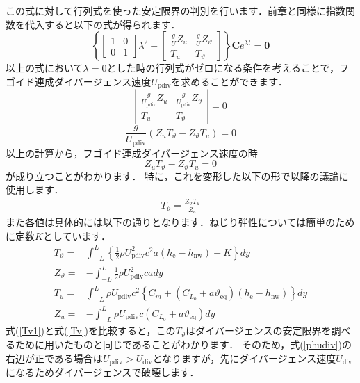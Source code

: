 \documentclass{jarticle}
\begin{document}
この式に対して行列式を使った安定限界の判別を行います．前章と同様に指数関数を代入すると以下の式が得られます．
\begin{equation}
    \left\{
    \begin{bmatrix}
        1 & 0 \\
        0 & 1
    \end{bmatrix}
    \lambda^2
    -
    \begin{bmatrix}
        \frac{g}{U}Z_u & \frac{g}{U}Z_\vartheta \\
        T_u & T_\vartheta
    \end{bmatrix}
    \right\}
    \bm{C}e^{\lambda t}
    =
    \bm{0}
\end{equation}
以上の式において$\lambda=0$とした時の行列式がゼロになる条件を考えることで，フゴイド連成ダイバージェンス速度$U_\mathrm{pdiv}$を求めることができます．
\begin{equation}
    \left|
    \begin{matrix}
        \frac{g}{U_\mathrm{pdiv}}Z_u & \frac{g}{U_\mathrm{pdiv}}Z_\vartheta \\
        T_u & T_\vartheta
    \end{matrix}
    \right|
    =0
\end{equation}
\begin{equation}\label{phudiv2}
    \frac{g}{U_\mathrm{pdiv}} (Z_u T_\vartheta - Z_\vartheta T_u ) = 0
\end{equation}
以上の計算から，フゴイド連成ダイバージェンス速度の時
\begin{equation}
    Z_u T_\vartheta - Z_\vartheta T_u  = 0
\end{equation}
が成り立つことがわかります．
特に，これを変形した以下の形で以降の議論に使用します．
\begin{align}\label{phudiv}
    T_\vartheta = \frac{Z_\vartheta T_u}{Z_u}
\end{align}
また各値は具体的には以下の通りとなります．ねじり弾性については簡単のために定数$K$としています．
\begin{align}
    T_\vartheta =& \int_{-L}^{L} \left\{ \frac{1}{2}\rho U_\mathrm{pdiv}^2 c^2 a  (h_\mathrm{e}-h_\mathrm{nw}) - K \right\} dy \label{Tv1} \\
    Z_\vartheta =& -\int_{-L}^L \frac{1}{2}\rho U_\mathrm{pdiv}^2 c a dy \\
    T_u =& \int_{-L}^L \rho U_\mathrm{pdiv} c^2 \left\{ C_m +  (C_{L_0} + a\vartheta_\mathrm{eq})  (h_\mathrm{e}-h_\mathrm{nw}) \right\} dy \\
    Z_u =& -\int_{-L}^L \rho U_\mathrm{pdiv} c (C_{L_0} + a\vartheta_\mathrm{eq}) dy
\end{align}
式(\ref{Tv1})と式(\ref{Tv})を比較すると，この$T_\vartheta$はダイバージェンスの安定限界を調べるために用いたものと同じであることがわかります．
そのため，式(\ref{phudiv})の右辺が正である場合は$U_\mathrm{pdiv}>U_\mathrm{div}$となりますが，先にダイバージェンス速度$U_\mathrm{div}$になるためダイバージェンスで破壊します．
\end{document}
